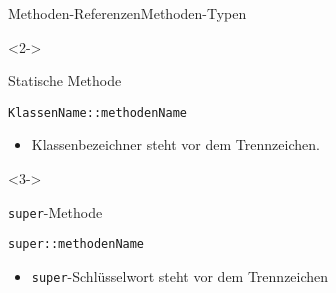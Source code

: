 \begin{frame}[fragile]{Methoden-Referenzen}{Methoden-Typen}

    \begin{onlyenv}<2->
        \begin{center}
            \begin{minipage}[b]{0.75\textwidth}
                \begin{block}{Statische Methode \citep{goetz13}}
                    \begin{lstlisting}
KlassenName::methodenName
                    \end{lstlisting}
                \end{block}
            \end{minipage}
        \end{center}

        \begin{itemize}
            \item Klassenbezeichner steht vor dem Trennzeichen.
        \end{itemize}
    \end{onlyenv}

    \begin{onlyenv}<3->
        \begin{center}
            \begin{minipage}[b]{0.75\textwidth}
                \begin{block}{\texttt{super}-Methode \citep{goetz13}}
                    \begin{lstlisting}
super::methodenName
                    \end{lstlisting}
                \end{block}
            \end{minipage}
        \end{center}

        \begin{itemize}
            \item \texttt{super}-Schlüsselwort steht vor dem Trennzeichen
        \end{itemize}
    \end{onlyenv}
\end{frame}

